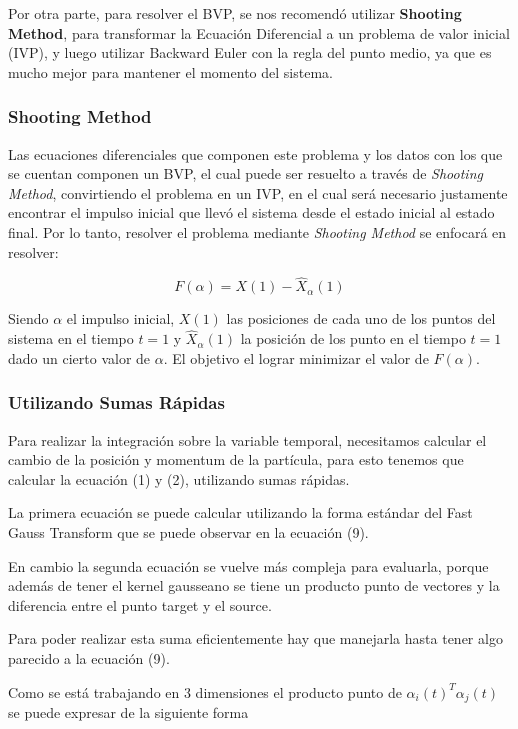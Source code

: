 \documentclass[letter, 10pt]{article}
\begin{document}
Por otra parte, para resolver el BVP, se nos recomendó utilizar \textbf{Shooting Method}, para transformar la Ecuación Diferencial a un problema de valor inicial (IVP), y luego utilizar Backward Euler con la regla del punto medio, ya que es mucho mejor para mantener el momento del sistema.

\subsubsection{Shooting Method}
Las ecuaciones diferenciales que componen este problema y los datos con los que se cuentan componen un BVP, el cual
puede ser resuelto a través de \textit{Shooting Method}, convirtiendo el problema en un IVP, en el cual será necesario
justamente encontrar el impulso inicial que llevó el sistema desde el estado inicial al estado final. Por lo tanto, 
resolver el problema mediante \textit{Shooting Method} se enfocará en resolver:

\begin{equation}
F(\alpha) = X(1) - \hat{X}_\alpha(1)
\end{equation}

Siendo \(\alpha\) el impulso inicial, \(X(1)\) las posiciones de cada uno de los puntos del sistema en el tiempo \(t = 1\) y
\(\hat{X}_\alpha(1)\) la posición de los punto en el tiempo \(t = 1\) dado un cierto valor de \(\alpha\). El objetivo el 
lograr minimizar el valor de \(F(\alpha)\).
\subsubsection{Utilizando Sumas Rápidas}
Para realizar la integración sobre la variable temporal, necesitamos calcular el cambio de la posición y momentum de la partícula, para esto tenemos que calcular la ecuación (1) y (2), utilizando sumas rápidas.

La primera ecuación se puede calcular utilizando la forma estándar del Fast Gauss Transform que se puede observar en la ecuación (9).

En cambio la segunda ecuación se vuelve más compleja para evaluarla, porque además de tener el kernel gausseano se tiene un producto punto de vectores y la diferencia entre el punto target y el source.

Para poder realizar esta suma eficientemente hay que manejarla hasta tener algo parecido a la ecuación (9).

Como se está trabajando en 3 dimensiones el producto punto de $\alpha_i(t)^T \alpha_j(t)$ se puede expresar de la siguiente forma
\end{document}
